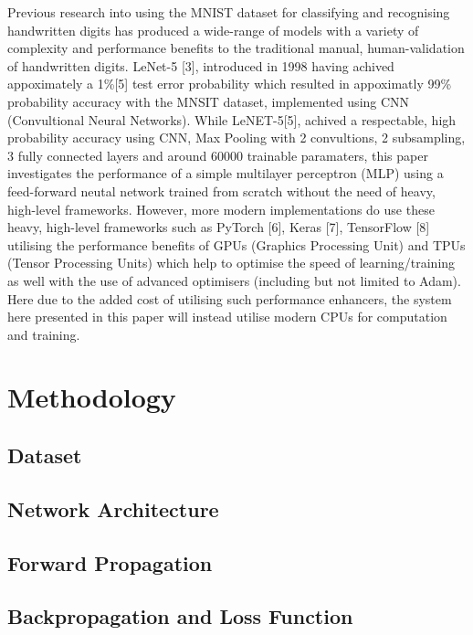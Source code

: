 \documentclass[11pt]{article}
\begin{document}
\vspace{1em}
Previous research into using the MNIST dataset for classifying and recognising handwritten digits has produced a wide-range of models with a variety of complexity and performance benefits to the traditional manual, human-validation of handwritten digits. LeNet-5 [3], introduced in 1998 having achived appoximately a 1\%[5] test error probability which resulted in appoximatly 99\% probability accuracy with the MNSIT dataset, implemented using CNN (Convultional Neural Networks). While LeNET-5[5], achived a respectable, high probability accuracy using CNN, Max Pooling with 2 convultions, 2 subsampling, 3 fully connected layers and around 60000 trainable paramaters, this paper investigates the performance of a simple multilayer perceptron (MLP) using a feed-forward neutal network trained from scratch without the need of heavy, high-level frameworks. However, more modern implementations do use these heavy, high-level frameworks such as PyTorch [6], Keras [7], TensorFlow [8] utilising the performance benefits of GPUs (Graphics Processing Unit) and TPUs (Tensor Processing Units) which help to optimise the speed of learning/training as well with the use of advanced optimisers (including but not limited to Adam). Here due to the added cost of utilising such performance enhancers, the system here presented in this paper will instead utilise modern CPUs for computation and training.


\section{Methodology}
\subsection{Dataset}

\subsection{Network Architecture}

\subsection{Forward Propagation}

\subsection{Backpropagation and Loss Function}
\end{document}
